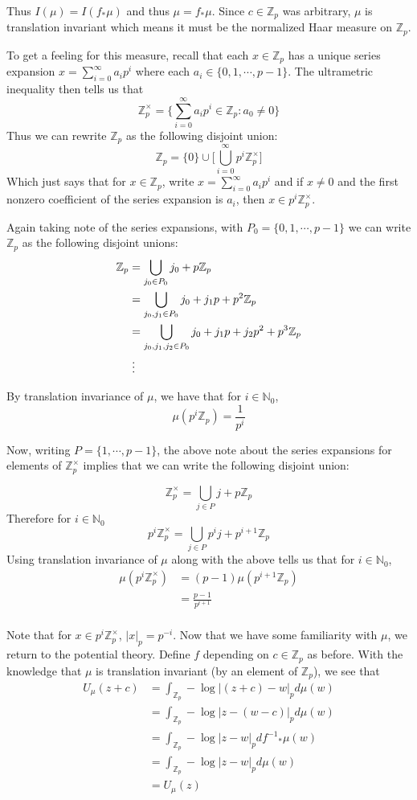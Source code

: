 \documentclass[12pt]{amsart}
\theoremstyle{definition}
\theoremstyle{remark}
\theoremstyle{definition}
\newcommand{\N}{\mathbb{N}}
\newcommand{\Z}{\mathbb{Z}}
\begin{document}
Thus $I(\mu) = I(f_* \mu)$ and thus $\mu = f_* \mu$. Since $c \in \Z_p$ was arbitrary, $\mu$ is translation invariant which means it must be the normalized Haar measure on $\Z_p$. 

To get a feeling for this measure, recall that each $x \in \Z_p$ has a unique series expansion $x = \sum_{i=0}^{\infty} a_ip^i$ where each $a_i \in \{0,1, \cdots ,p-1 \}$. The ultrametric inequality then tells us that $$\Z_p^{\times} = \bigg\{ \sum_{i=0}^{\infty} a_ip^i \in \Z_p: a_0 \neq 0 \bigg\}$$
Thus we can rewrite $\Z_p$ as the following disjoint union: $$\Z_p = \{0\}\cup \bigg[\bigcup_{i=0}^{\infty} p^i\Z_p^{\times}\bigg]$$ Which just says that for $x \in \Z_p$, write $x = \sum_{i=0}^{\infty} a_ip^i$ and if $x \neq 0$ and the first nonzero coefficient  of the series expansion is $a_i$, then $x \in p^i \Z_p^{\times}$. 

Again taking note of the series expansions, with $P_0 = \{0, 1, \cdots ,p-1 \}$ we can write $\Z_p$ as the following disjoint unions: 
\begin{align*}
\Z_p 
&= \bigcup_{j_0 \in P_0} j_0 + p\Z_p\\
&= \bigcup_{j_0, j_1 \in P_0} j_0 + j_1p + p^2\Z_p\\
&= \bigcup_{j_0, j_1, j_2 \in P_0} j_0 + j_1p + j_2p^2 + p^3\Z_p\\
&\hspace{1mm} \vdots
\end{align*}

By translation invariance of $\mu$, we have that for $i \in \N_0$, $$\mu(p^i \Z_p) = \frac{1}{p^i}$$

Now, writing $P = \{1, \cdots ,p-1 \}$, the above note about the series expansions for elements of $\Z_p^{\times}$ implies that we can write the following disjoint union: 

$$
\Z_p^{\times} = \bigcup_{j \in P} j + p\Z_p $$
Therefore for $i \in \N_0$ $$p^i\Z_p^{\times} = \bigcup_{j \in P} p^ij + p^{i+1}\Z_p$$ 
Using translation invariance of $\mu$ along with the above tells us that for $i \in \N_0$, 
\begin{align*}
\mu(p^i\Z_p^{\times}) 
&= (p-1)\mu(p^{i+1}\Z_p)\\
&= \frac{p-1}{p^{i+1}} \\
\end{align*} 

Note that for $x \in p^i \Z_p^{\times}$, $|x|_p = p^{-i}$. Now that we have some familiarity with $\mu$, we return to the potential theory. Define $f$ depending on $c \in \Z_p$ as before. With the knowledge that $\mu$ is translation invariant (by an element of $\Z_p$), we see that 
\begin{align*}
U_{\mu}(z+c) 
&= \int_{\Z_p}-\log|(z+c)-w|_pd\mu(w) \\
&= \int_{\Z_p} - \log|z-(w-c)|_p d\mu(w)\\
&= \int_{\Z_p} - \log|z-w|_p d{f^{-1}}_*\mu(w)\\
&= \int_{\Z_p} - \log|z-w|_p d\mu(w)\\
&= U_{\mu}(z)\\
\end{align*} 
\end{document}
